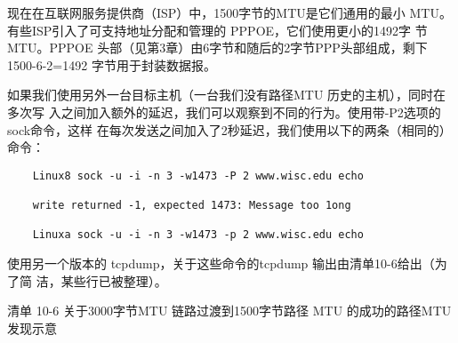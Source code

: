 \begin{tcolorbox}
    现在在互联网服务提供商（ISP）中，1500字节的MTU是它们通用的最小
    MTU。有些ISP引入了可支持地址分配和管理的 PPPOE，它们使用更小的1492字
    节MTU。PPPOE 头部（见第3章）由6字节和随后的2字节PPP头部组成，剩下
    1500-6-2=1492 字节用于封装数据报。
\end{tcolorbox}

如果我们使用另外一台目标主机（一台我们没有路径MTU 历史的主机），同时在多次写
入之间加入额外的延迟，我们可以观察到不同的行为。使用带-P2选项的sock命令，这样
在每次发送之间加入了2秒延迟，我们使用以下的两条（相同的）命令：

\begin{verbatim}
    Linux8 sock -u -i -n 3 -w1473 -P 2 www.wisc.edu echo
    
    write returned -1, expected 1473: Message too 1ong
    
    Linuxa sock -u -i -n 3 -w1473 -p 2 www.wisc.edu echo
\end{verbatim}

使用另一个版本的 tcpdump，关于这些命令的tcpdump 输出由清单10-6给出（为了简
洁，某些行已被整理）。

清单 10-6 关于3000字节MTU 链路过渡到1500字节路径 MTU 的成功的路径MTU 发现示意


